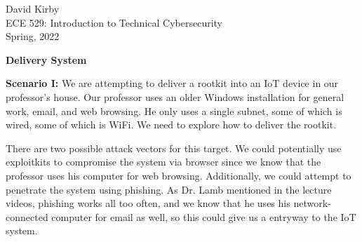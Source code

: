 \documentclass[12pt]{article}
\begin{document}
\setmainfont{SF Pro Text}
\setsansfont{SF Pro Text}
\setmonofont{SF Mono}
\renewcommand{\familydefault}{\sfdefault}

\hypersetup{
    linkcolor=CrispBlue,
    urlcolor=CrispBlue,
    breaklinks=true
}

\noindent David Kirby\\
ECE 529: Introduction to Technical Cybersecurity\\
Spring, 2022
\begin{center}
    \large\bfseries Delivery System
\end{center}


\textbf{Scenario I:}
We are attempting to deliver a rootkit into an IoT device in our professor's house. Our professor uses an older Windows installation for general work, email, and web browsing. He only uses a single subnet, some of which is wired, some of which is WiFi. We need to explore how to deliver the rootkit.

There are two possible attack vectors for this target. We could potentially use exploitkits to compromise the system via browser since we know that the professor uses his computer for web browsing. Additionally, we could attempt to penetrate the system using phishing. As Dr. Lamb mentioned in the lecture videos, phishing works all too often, and we know that he uses his network-connected computer for email as well, so this could give us a entryway to the IoT system.
\end{document}
